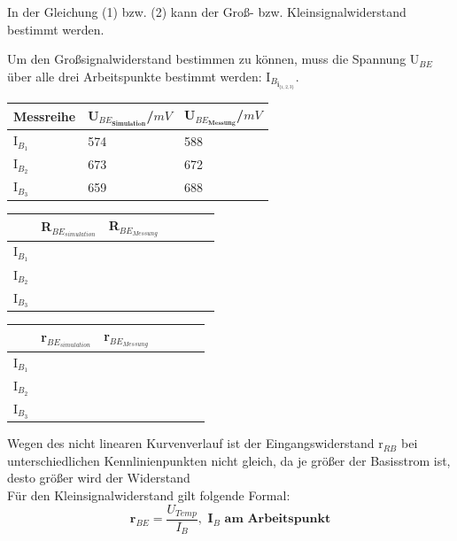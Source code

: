 In der Gleichung (1) bzw. (2) kann der Gro\ss - bzw. Kleinsignalwiderstand bestimmt werden.
\begin{table}[!h]
Um den Gro\ss signalwiderstand bestimmen zu k\"onnen, muss die Spannung U$_{BE}$ \"uber alle drei Arbeitspunkte bestimmt werden:  I$_{B_{\textbf{i}_{\{1,2,3\}}}}$. 
\begin{center}
\begin{tabular}{|l|l|l|}
\hline
Messreihe & U$_{{BE}_{\textbf{Simulation}}}$/$mV$ & U$_{{BE}_{\textbf{Messung}}}$/$mV$\\
\hline
I$_{B_1}$ & 574 & 588 \\
\hline
I$_{B_2}$ & 673 & 672 \\
\hline
I$_{B_3}$ & 659 & 688 \\
\hline
\end{tabular}
\end{center}
\begin{center}
\begin{tabular}{|l|l|l|l|l|l|l|}
\hline
& R$_{BE_{simulation}}$ & R$_{BE_{Messung}}$ \\
\hline
I$_{B_1}$ &  & \\
\hline
I$_{B_2}$ & & \\
\hline
I$_{B_3}$ & & \\
\hline
\end{tabular}
\end{center}
\end{table}
\begin{table}[!h]
\begin{center}
\begin{tabular}{|l|l|l|l|l|l|l|}
\hline
& r$_{BE_{simulation}}$ & r$_{BE_{Messung}}$ \\
\hline
I$_{B_1}$ &  & \\
\hline
I$_{B_2}$ & & \\
\hline
I$_{B_3}$ & & \\
\hline
\end{tabular}
\end{center}
Wegen des nicht linearen Kurvenverlauf ist der Eingangswiderstand r$_{RB}$ bei unterschiedlichen Kennlinienpunkten nicht gleich, da je gr\"o\ss er der Basisstrom ist, desto gr\"o\ss er wird der Widerstand \\
F\"ur den Kleinsignalwiderstand gilt folgende Formal: \begin{equation*}
\textbf{r$_{BE}$} = \frac{U_{Temp}}{I_B}, \textbf{\ \ I$_B$ am Arbeitspunkt}
\end{equation*}
\end{table}
\newpage